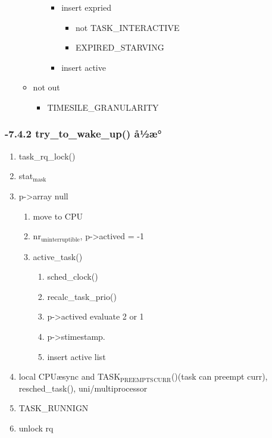 \documentclass[11pt]{article}
\begin{document}
\begin{itemize}
\begin{itemize}
\begin{itemize}
\begin{itemize}
\item insert expried

\begin{itemize}
\item not TASK\_INTERACTIVE
\item EXPIRED\_STARVING
\end{itemize}

\item insert active
\end{itemize}

\end{itemize}

\item not out

\begin{itemize}
\item TIMESILE\_GRANULARITY
\end{itemize}

\end{itemize}
\end{itemize} %
\subsubsection{-7.4.2 try\_to\_wake\_up() å½æ°}
\label{sec-2.4.2}

    
\begin{enumerate}
\item task\_rq\_lock()
\item stat$_{\mathrm{mask}}$
\item p->array null

\begin{enumerate}
\item move to CPU
\item nr$_{\mathrm{uninterruptible}}$, p->actived = -1
\item active\_task()

\begin{enumerate}
\item sched\_clock()
\item recalc\_task\_prio()
\item p->actived evaluate 2 or 1
\item p->stimestamp.
\item insert active list
\end{enumerate}

\end{enumerate}

\item local CPUæsync and TASK$_{\mathrm{PREEMPTS}}$$_{\mathrm{CURR}}$()(task can preempt curr),
   resched\_task(), uni/multiprocessor
\item TASK\_RUNNIGN
\item unlock rq
\end{enumerate}
\end{document}
